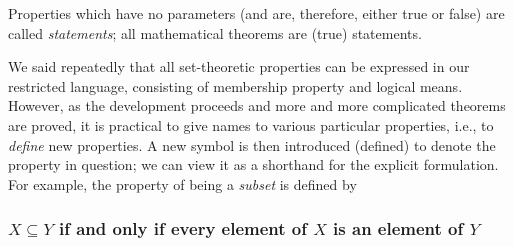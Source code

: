 \documentclass[12pt,a4paper,twoside,openany]{book}
\begin{document}
Properties which have no parameters (and are, therefore, either true or false) are called \textit{statements}; all mathematical theorems are (true) statements.

We said repeatedly that all set-theoretic properties can be expressed in our restricted language, consisting of membership property and logical means. However, as the development proceeds and more and more complicated theorems are proved, it is practical to give names to various particular properties, i.e., to \textit{define} new properties. A new symbol is then introduced (defined) to denote the property in question; we can view it as a shorthand for the explicit formulation. For example, the property of being a \textit{subset} is defined by

\subsubsection{$X\subseteq Y$ if and only if every element of $X$ is an element of $Y$}

\end{document}
